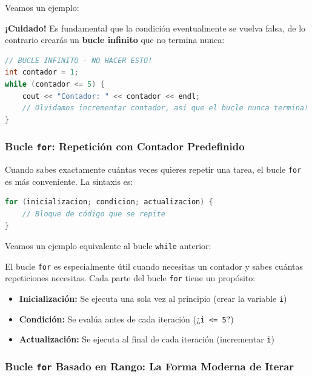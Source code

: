 Veamos un ejemplo:



\textbf{¡Cuidado!} Es fundamental que la condición eventualmente se vuelva falsa, de lo contrario crearás un \textbf{bucle infinito} que no termina nunca:

\begin{lstlisting}[language=C++]
// BUCLE INFINITO - NO HACER ESTO!
int contador = 1;
while (contador <= 5) {
    cout << "Contador: " << contador << endl;
    // Olvidamos incrementar contador, asi que el bucle nunca termina!
}
\end{lstlisting}

\subsubsection{Bucle \texttt{for}: Repetición con Contador Predefinido}

Cuando sabes exactamente cuántas veces quieres repetir una tarea, el bucle \texttt{for} es más conveniente. La sintaxis es:

\begin{lstlisting}[language=C++]
for (inicializacion; condicion; actualizacion) {
    // Bloque de código que se repite
}
\end{lstlisting}

Veamos un ejemplo equivalente al bucle \texttt{while} anterior:



El bucle \texttt{for} es especialmente útil cuando necesitas un contador y sabes cuántas repeticiones necesitas. Cada parte del bucle \texttt{for} tiene un propósito:

\begin{itemize}
    \item \textbf{Inicialización:} Se ejecuta una sola vez al principio (crear la variable \texttt{i})
    \item \textbf{Condición:} Se evalúa antes de cada iteración (¿\texttt{i <= 5}?)
    \item \textbf{Actualización:} Se ejecuta al final de cada iteración (incrementar \texttt{i})
\end{itemize}

\subsubsection{Bucle \texttt{for} Basado en Rango: La Forma Moderna de Iterar}


